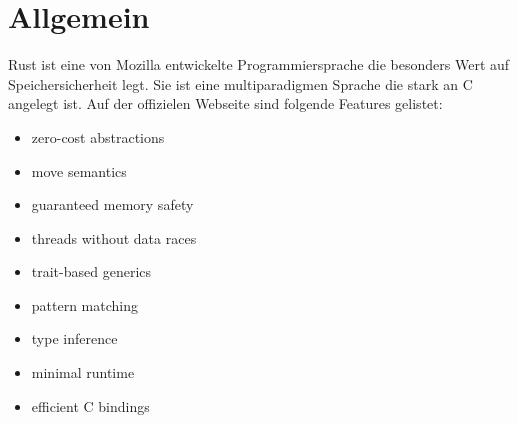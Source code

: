\section{Allgemein}
Rust ist eine von Mozilla entwickelte Programmiersprache die besonders Wert auf Speichersicherheit legt.
Sie ist eine multiparadigmen Sprache die stark an C angelegt ist.
Auf der offizielen Webseite sind folgende Features gelistet:

\begin{itemize}	
\item zero-cost abstractions
\item move semantics
\item guaranteed memory safety
\item threads without data races
\item trait-based generics
\item pattern matching
\item type inference
\item minimal runtime
\item efficient C bindings
\end{itemize}








